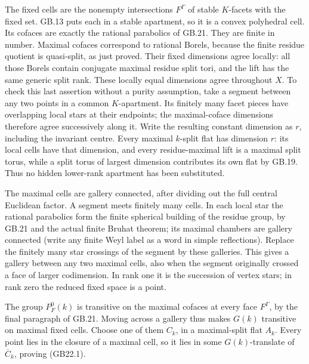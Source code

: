 \documentclass[
  11pt,
]{article}
\begin{document}
The fixed cells are the nonempty intersections \(F^\Gamma\) of stable
\(K\)-facets with the fixed set. GB.13 puts each in a stable apartment,
so it is a convex polyhedral cell. Its cofaces are exactly the rational
parabolics of GB.21. They are finite in number. Maximal cofaces
correspond to rational Borels, because the finite residue quotient is
quasi-split, as just proved. Their fixed dimensions agree locally: all
those Borels contain conjugate maximal residue split tori, and the lift
has the same generic split rank. These locally equal dimensions agree
throughout \(X\). To check this last assertion without a purity
assumption, take a segment between any two points in a common
\(K\)-apartment. Its finitely many facet pieces have overlapping local
stars at their endpoints; the maximal-coface dimensions therefore agree
successively along it. Write the resulting constant dimension as \(r\),
including the invariant centre. Every maximal \(k\)-split flat has
dimension \(r\): its local cells have that dimension, and every
residue-maximal lift is a maximal split torus, while a split torus of
largest dimension contributes its own flat by GB.19. Thus no hidden
lower-rank apartment has been substituted.

The maximal cells are gallery connected, after dividing out the full
central Euclidean factor. A segment meets finitely many cells. In each
local star the rational parabolics form the finite spherical building of
the residue group, by GB.21 and the actual finite Bruhat theorem; its
maximal chambers are gallery connected (write any finite Weyl label as a
word in simple reflections). Replace the finitely many star crossings of
the segment by these galleries. This gives a gallery between any two
maximal cells, also when the segment originally crossed a face of larger
codimension. In rank one it is the succession of vertex stars; in rank
zero the reduced fixed space is a point.

The group \(P_F^0(k)\) is transitive on the maximal cofaces at every
face \(F^\Gamma\), by the final paragraph of GB.21. Moving across a
gallery thus makes \(G(k)\) transitive on maximal fixed cells. Choose
one of them \(C_k\), in a maximal-split flat \(A_k\). Every point lies
in the closure of a maximal cell, so it lies in some \(G(k)\)-translate
of \(\overline C_k\), proving (GB22.1).
\end{document}
